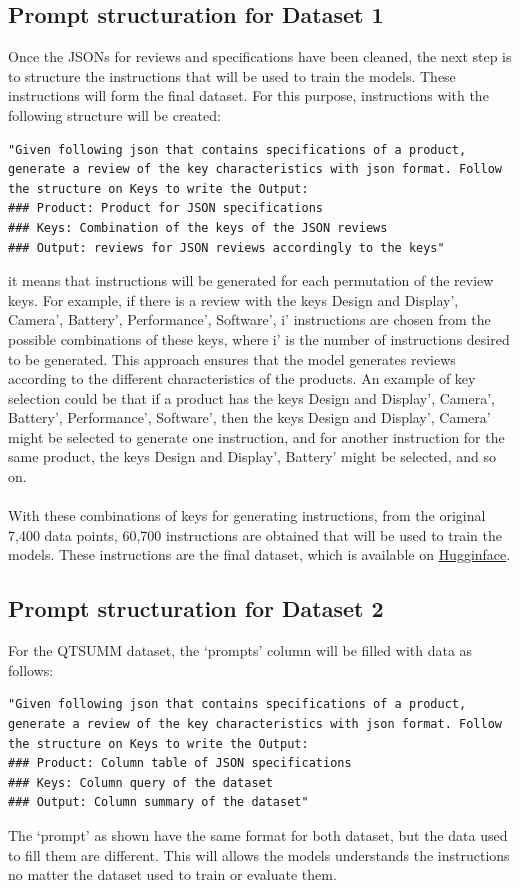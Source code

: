 \subsection{Prompt structuration for Dataset 1}
Once the JSONs for reviews and specifications have been cleaned, the next step is to structure the instructions that will be used to train the models. These instructions will form the final dataset. For this purpose, instructions with the following structure will be created:
\begin{lstlisting}[style=textstyle, frame = single, caption=Prompt structuration, label=code:prompt-structuration]
"Given following json that contains specifications of a product, generate a review of the key characteristics with json format. Follow the structure on Keys to write the Output: 
### Product: Product for JSON specifications
### Keys: Combination of the keys of the JSON reviews
### Output: reviews for JSON reviews accordingly to the keys"
\end{lstlisting}
it means that instructions will be generated for each permutation of the review keys. For example, if there is a review with the keys Design and Display', Camera', Battery', Performance', Software', i' instructions are chosen from the possible combinations of these keys, where i' is the number of instructions desired to be generated. This approach ensures that the model generates reviews according to the different characteristics of the products. An example of key selection could be that if a product has the keys Design and Display', Camera', Battery', Performance', Software', then the keys Design and Display', Camera' might be selected to generate one instruction, and for another instruction for the same product, the keys Design and Display', Battery' might be selected, and so on.
\\\\
With these combinations of keys for generating instructions, from the original 7,400 data points, 60,700 instructions are obtained that will be used to train the models. These instructions are the final dataset, which is available on \href{https://huggingface.co/datasets/kokujin/json_data_luis}{Hugginface}.

\subsection{Prompt structuration for Dataset 2}
For the QTSUMM dataset, the `prompts' column will be filled with data as follows:
\newpage
\begin{lstlisting}[style=textstyle, frame = single, caption=Prompt structuration, label=code:prompt-structuration]
"Given following json that contains specifications of a product, generate a review of the key characteristics with json format. Follow the structure on Keys to write the Output: 
### Product: Column table of JSON specifications
### Keys: Column query of the dataset
### Output: Column summary of the dataset"
\end{lstlisting}
The `prompt' as shown have the same format for both dataset, but the data used to fill them are different. This will allows the models understands the instructions no matter the dataset used to train or evaluate them.


